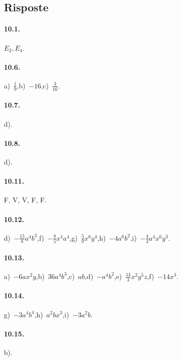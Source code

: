 \subsection{Risposte}

\paragraph{10.1.} $E_2, E_4$.

\paragraph{10.6.} a)~$\frac{1}{9}$,\quad b)~$-16$,\quad c)~$\frac{3}{16}$.

\paragraph{10.7.} d).

\paragraph{10.8.} d).

\paragraph{10.11.} F, V, V, F, F.

\paragraph{10.12.} d)~$-\frac{15}{8}a^{4}b^{3}$,\quad f)~$-\frac{8}{5}x^{4}a^{4}$,\quad g)~$\frac{5}{9}x^{6}y^{4}$,\quad h)~$-4a^{6}b^{2}$,\quad i)~$-\frac{4}{3}a^{4}x^{6}y^{3}$.

\paragraph{10.13.} a)~$-6ax^{2}y$,\quad b)~$36a^{4}b^{3}$,\quad c)~$ab$,\quad d)~$-a^{4}b^{2}$,\quad e)~$\frac{14}{3}x^{2}y^{5}z$,\quad f)~$-14x^{3}$.

\paragraph{10.14.} g)~$-3a^{4}b^{4}$,\quad h)~$a^{2}bx^{3}$,\quad i)~$-3a^{2}b$.

\paragraph{10.15.} b).

